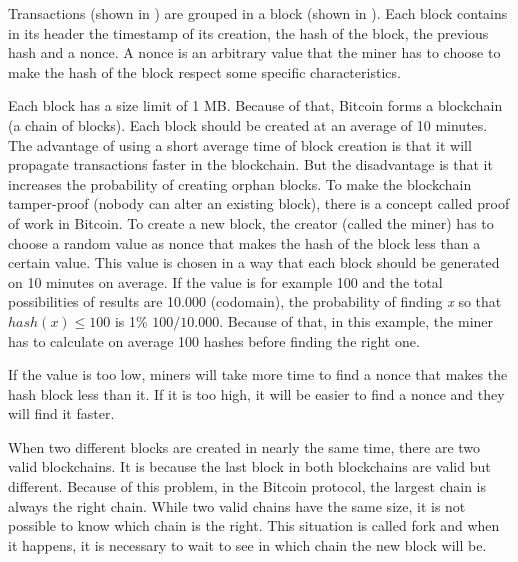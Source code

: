 
Transactions (shown in ) are grouped in a block (shown in ).
Each block contains in its header the timestamp of its creation, the hash of the block,
the previous hash and a nonce.
A nonce is an arbitrary value that the miner has to choose to make the hash of the block respect some
specific characteristics.


Each block has a size limit of 1 MB.
Because of that, Bitcoin forms a blockchain (a chain of blocks).
Each block should be created at an average of 10 minutes.
The advantage of using a short average time of block creation is that it will propagate transactions
faster in the blockchain.
But the disadvantage is that it increases the probability of creating orphan blocks.
To make the blockchain tamper-proof (nobody can alter an existing block),
there is a concept called proof of work in Bitcoin.
To create a new block, the creator (called the miner) has to choose a random value as nonce that makes
the hash of the block less than a certain value.
This value is chosen in a way that each block should be generated on 10 minutes on average.
If the value is for example 100 and the total possibilities of results are 10.000 (codomain),
the probability of finding \emph{x} so that $hash(x) \leqslant 100$ is 1\% $100/10.000$.
Because of that, in this example, the miner has to calculate on average 100 hashes before finding
the right one.

If the value is too low, miners will take more time to find a nonce that makes the hash block
less than it.
If it is too high, it will be easier to find a nonce and they will find it faster.

When two different blocks are created in nearly the same time, there are two valid blockchains.
It is because the last block in both blockchains are valid but different.
Because of this problem, in the Bitcoin protocol, the largest chain is always the right chain.
While two valid chains have the same size, it is not possible to know which chain is the right.
This situation is called fork and when it happens, it is necessary to wait to see in which chain
the new block will be.

